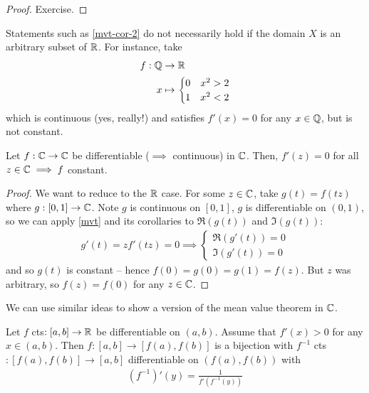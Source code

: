\documentclass{../template/note}
\begin{document}
    \begin{proof}
        Exercise.
    \end{proof}
    
    \begin{remark*}
        Statements such as \cref{mvt-cor-2} do not necessarily hold if the domain \(X\) is an arbitrary subset of \(\mathbb R\). For instance, take
        \begin{align*}
            f: \mathbb Q &\to \mathbb R \\
            x &\mapsto \begin{cases}
                0 & x^2 > 2 \\
                1 & x^2 < 2
            \end{cases}
        \end{align*}
        which is continuous (yes, really!) and satisfies \(f'(x) = 0\) for any \(x \in \mathbb Q\), but is not constant.        
    \end{remark*}
    
    \begin{lemma}
        Let \(f: \mathbb C \to \mathbb C\) be differentiable (\(\implies\) continuous) in \(\mathbb C\). Then, \(f'(z) = 0\) for all \(z \in \mathbb C \implies f\) constant.
    \end{lemma}
    
    \begin{proof}
        We want to reduce to the \(\mathbb R\) case. For some \(z \in \mathbb C\), take \(g(t) = f(tz)\) where \(g: [0, 1] \to \mathbb C\). Note \(g\) is continuous on \([0, 1]\), \(g\) is differentiable on \((0, 1)\), so we can apply \cref{mvt} and its corollaries to \(\Re(g(t))\) and \(\Im(g(t))\):
        \begin{align*}
            g'(t) = zf'(tz) = 0 \implies \begin{cases}
                \Re(g'(t)) = 0 \\
                \Im(g'(t)) = 0
            \end{cases}
        \end{align*}
        and so \(g(t)\) is constant -- hence \(f(0) = g(0) = g(1) = f(z)\). But \(z\) was arbitrary, so \(f(z) = f(0)\) for any \(z \in \mathbb C\).
    \end{proof}
    
    \begin{remark*}
        We can use similar ideas to show a version of the mean value theorem in \(\mathbb C\).
    \end{remark*}
    
    \begin{theorem}
        \label{ift-2}
        Let \(f\) cts\(: [a, b] \to \mathbb R\) be differentiable on \((a, b)\). Assume that \(f'(x) > 0\) for any \(x \in (a, b)\). Then \(f: [a, b] \to [f(a), f(b)]\) is a bijection with \(f^{-1}\) cts\(: [f(a), f(b)] \to [a, b]\) differentiable on \((f(a), f(b))\) with
        \begin{align*}
            (f^{-1})'(y) = \frac 1 {f'(f^{-1}(y))}
        \end{align*}
    \end{theorem}
    
\end{document}
